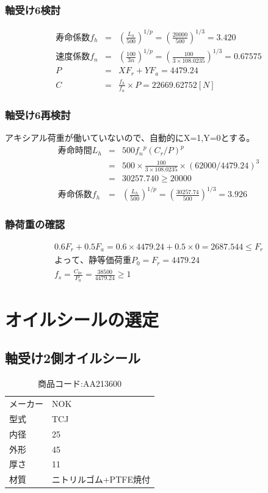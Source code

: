 \documentclass[a4j,twoside,openright,11pt]{jreport}
\begin{document}
\subsubsection{軸受け6検討}
\begin{eqnarray}
寿命係数f_h &=& \left( \frac{L_h}{500} \right)^{1/p} = \left( \frac{20000}{500} \right)^{1/3} = 3.420\\
速度係数f_n &=& \left( \frac{100}{3n} \right)^{1/p} = \left( \frac{100}{3 \times 108.0235} \right)^{1/3} = 0.67575\\
P &=& XF_r+YF_a = 4479.24\\
C &=& \frac{f_h}{f_n} \times P = 22669.62752[N]
\end{eqnarray}

\subsubsection{軸受け6再検討}
アキシアル荷重が働いていないので、自動的にX=1,Y=0とする。
\begin{eqnarray}
寿命時間L_h &=& 500{f_n}^p(C_r/P)^p\\
           &=& 500 \times \frac{100}{3 \times 108.0235} \times (62000/4479.24)^3\\
           &=& 30257.740 \geq 20000\\
寿命係数f_h &=& \left( \frac{L_h}{500} \right)^{1/p} = \left( \frac{30257.74}{500} \right)^{1/3} = 3.926
\end{eqnarray}

\subsubsection{静荷重の確認}
\begin{eqnarray}
0.6F_r+0.5F_a=0.6 \times 4479.24 + 0.5 \times 0 = 2687.544 \leq F_r\\
よって、静等価荷重P_0 = F_r = 4479.24\\
f_s = \frac{C_{0r}}{P_0} = \frac{38500}{4479.24} \geq 1
\end{eqnarray}

\section{オイルシールの選定}
\subsection{軸受け2側オイルシール}
\begin{table}[htb]
\begin{center}
  \caption{商品コード:AA213600}
  \begin{tabular}{ll}
    \hline
    メーカー&NOK\\
    型式&TCJ\\
    内径&25\\
    外形&45\\
    厚さ&11\\
    材質&ニトリルゴム+PTFE焼付\\
    \hline
  \end{tabular}
\end{center}
\end{table}
\end{document}
